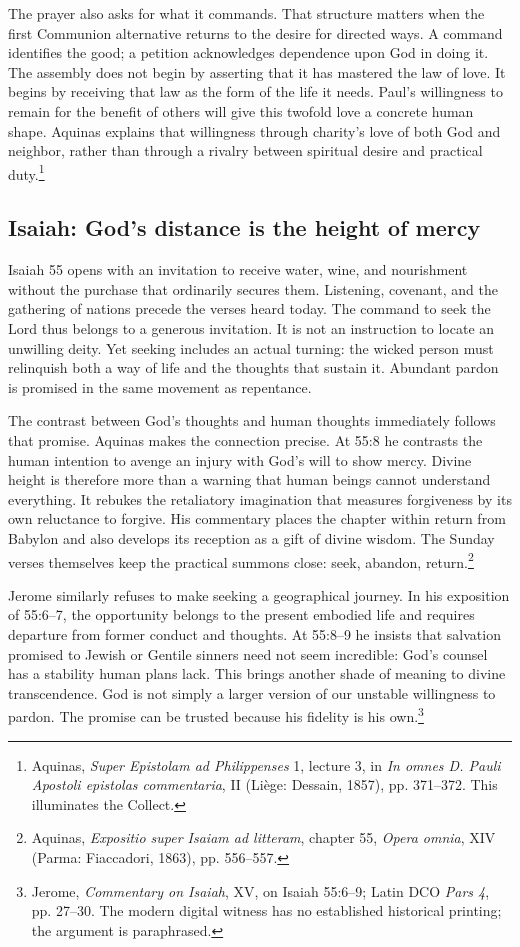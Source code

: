 The prayer also asks for what it commands. That structure matters when the first Communion alternative returns to the desire for directed ways. A command identifies the good; a petition acknowledges dependence upon God in doing it. The assembly does not begin by asserting that it has mastered the law of love. It begins by receiving that law as the form of the life it needs. Paul's willingness to remain for the benefit of others will give this twofold love a concrete human shape. Aquinas explains that willingness through charity's love of both God and neighbor, rather than through a rivalry between spiritual desire and practical duty.\footnote{Aquinas, \textit{Super Epistolam ad Philippenses} 1, lecture 3, in \textit{In omnes D. Pauli Apostoli epistolas commentaria}, II (Liège: Dessain, 1857), pp. 371--372. This illuminates the Collect.}

\subsection{Isaiah: God's distance is the height of mercy}
Isaiah 55 opens with an invitation to receive water, wine, and nourishment without the purchase that ordinarily secures them. Listening, covenant, and the gathering of nations precede the verses heard today. The command to seek the Lord thus belongs to a generous invitation. It is not an instruction to locate an unwilling deity. Yet seeking includes an actual turning: the wicked person must relinquish both a way of life and the thoughts that sustain it. Abundant pardon is promised in the same movement as repentance.

The contrast between God's thoughts and human thoughts immediately follows that promise. Aquinas makes the connection precise. At 55:8 he contrasts the human intention to avenge an injury with God's will to show mercy. Divine height is therefore more than a warning that human beings cannot understand everything. It rebukes the retaliatory imagination that measures forgiveness by its own reluctance to forgive. His commentary places the chapter within return from Babylon and also develops its reception as a gift of divine wisdom. The Sunday verses themselves keep the practical summons close: seek, abandon, return.\footnote{Aquinas, \textit{Expositio super Isaiam ad litteram}, chapter 55, \textit{Opera omnia}, XIV (Parma: Fiaccadori, 1863), pp. 556--557.}

Jerome similarly refuses to make seeking a geographical journey. In his exposition of 55:6--7, the opportunity belongs to the present embodied life and requires departure from former conduct and thoughts. At 55:8--9 he insists that salvation promised to Jewish or Gentile sinners need not seem incredible: God's counsel has a stability human plans lack. This brings another shade of meaning to divine transcendence. God is not simply a larger version of our unstable willingness to pardon. The promise can be trusted because his fidelity is his own.\footnote{Jerome, \textit{Commentary on Isaiah}, XV, on Isaiah 55:6--9; Latin DCO \textit{Pars 4}, pp. 27--30. The modern digital witness has no established historical printing; the argument is paraphrased.}


